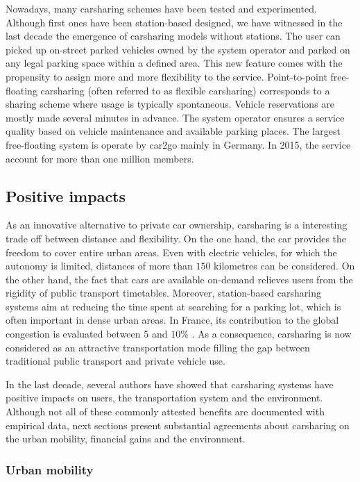 \begin{bibunit}[ieeetr]
Nowadays, many carsharing schemes have been tested and experimented.
Although first ones have been station-based designed, we have witnessed in the last decade the emergence of carsharing models without stations.
The user can picked up on-street parked vehicles owned by the system operator and parked on any legal parking space within a defined area.
This new feature comes with the propensity to assign more and more flexibility to the service.
Point-to-point free-floating carsharing (often referred to as flexible carsharing) corresponds to a sharing scheme where usage is typically spontaneous.
Vehicle reservations are mostly made several minutes in advance.
The system operator ensures a service quality based on vehicle maintenance and available parking places.
The largest free-floating system is operate by car2go mainly in Germany.
In 2015, the service account for more than one million members.

\subsection{Positive impacts}
As an innovative alternative to private car ownership, carsharing is a interesting trade off between distance and flexibility.
On the one hand, the car provides the freedom to cover entire urban areas.
Even with electric vehicles, for which the autonomy is limited, distances of more than $150$ kilometres can be considered.
On the other hand, the fact that cars are available on-demand relieves users from the rigidity of public transport timetables.
Moreover, station-based carsharing systems aim at reducing the time spent at searching for a parking lot, which is often important in dense urban areas.
In France, its contribution to the global congestion is evaluated between $5$ and $10$\%  \cite{stationnement_intelligent_cerema}.
As a consequence, carsharing is now considered as an attractive transportation mode filling the gap between traditional public transport and private vehicle use.

\medskip
In the last decade, several authors have showed that carsharing systems have positive impacts on users, the transportation system and the environment.
Although not all of these commonly attested benefits are documented with empirical data, next sections present substantial agreements about carsharing on the urban mobility, financial gains and the environment.


\subsubsection{Urban mobility}


\end{bibunit}
